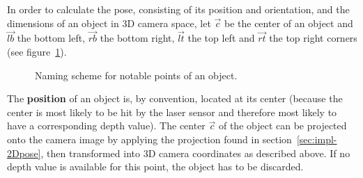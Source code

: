 In order to calculate the pose, consisting of its position and orientation, and the dimensions of an object in 3D camera space, let $\overrightarrow{c}$ be the center of an object and $\overrightarrow{lb}$ the bottom left, $\overrightarrow{rb}$ the bottom right, $\overrightarrow{lt}$ the top left and $\overrightarrow{rt}$ the top right corners (see figure~\ref{fig:image-points}).

\begin{figure}[H]
  \centering
  \caption{Naming scheme for notable points of an object.}
  \label{fig:image-points}
\end{figure}

The \textbf{position} of an object is, by convention, located at its center (because the center is most likely to be hit by the laser sensor and therefore most likely to have a corresponding depth value). The center $\overrightarrow{c}$ of the object can be projected onto the camera image by applying the projection found in section~\ref{sec:impl-2Dpose}, then transformed into 3D camera coordinates as described above. If no depth value is available for this point, the object has to be discarded. \\

